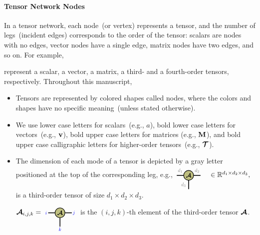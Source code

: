 \paragraph{Tensor Network Nodes}\label{def:tn-nodes}
In a tensor network, each node~(or vertex) represents a tensor, and the number of legs~(incident edges) corresponds to the order of the tensor: scalars are nodes with no edges, vector nodes have a single edge, matrix nodes have two edges, and so on. For example,
\begin{center}
    
\end{center}
represent a scalar, a vector, a matrix, a third- and a fourth-order tensors, respectively. 
Throughout this manuscript,
\begin{itemize}
    \item Tensors are represented by colored shapes called nodes, where the colors and shapes have no specific meaning~(unless stated otherwise). 
    \item We use lower case letters for scalars~(e.g., $a$), bold lower case letters for vectors~(e.g., $\mathbf{v}$), bold upper case letters for matrices (e.g., $\mathbf{M}$), and 
    bold upper case calligraphic letters for higher-order tensors~(e.g., $\bm{\mathcal{T}}$).
    \item The dimension of each mode of a tensor is depicted by a gray letter positioned at the top of the corresponding leg, e.g., 
$
    \begin{tikzpicture}[baseline=-0.5ex]
    \tikzset{tensor/.style = {minimum size = 0.5cm,shape = circle,thick,draw=black,inner sep = 0pt}, edge/.style = {thick,line width=.4mm},every loop/.style={}}
    \def\y{0}
    \def\x{0}
    \node[tensor,fill=green!50!red!50!white] (A) at (\x,\y){\scalebox{0.85}{$\At$}};
    \draw[edge] (\x+0.25,\y) -- (\x+0.6,\y)  node [midway,above] {\scalebox{0.7}{\dimcolor{$d_2$}}};
    \draw[edge] (\x-0.25,\y) -- (\x-0.6,\y)  node [midway,above] {\scalebox{0.7}{\dimcolor{$d_1$}}};
    \draw[edge] (\x,\y-0.25) -- (\x,\y-0.7)  node [midway,left] {\scalebox{0.7}{\dimcolor{$d_3$}}};
    \end{tikzpicture}
    \ \ \ \in \RR^{d_1\times d_2\times d_3},
$
is a third-order tensor of size $d_1\times d_2\times d_3$.
    
$
\At_{i,j,k} = 
    \begin{tikzpicture}[baseline=-0.5ex]
    \tikzset{tensor/.style = {minimum size = 0.5cm,shape = circle,thick,draw=black,inner sep = 0pt}, edge/.style = {thick,line width=.4mm},every loop/.style={}}
    \def\y{0}
    \def\x{0}
    \node[tensor,fill=green!50!red!50!white] (A) at (\x,\y){\scalebox{0.85}{$\At$}};
    \draw[edge] (\x+0.25,\y) -- (\x+0.6,\y)  node [pos=1.3] {\scalebox{0.7}{\indcolor{$j$}}};
    \draw[edge] (\x-0.25,\y) -- (\x-0.6,\y)  node [pos=1.3] {\scalebox{0.7}{\indcolor{$i$}}};
    \draw[edge] (\x,\y-0.25) -- (\x,\y-0.7)  node [pos=1.3] {\scalebox{0.7}{\indcolor{$k$}}};
    \end{tikzpicture}
$    
is the $(i,j,k)$-th element of the third-order tensor $\bm{\mathcal{A}}$.
\end{itemize}
